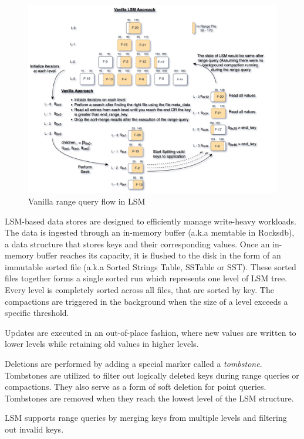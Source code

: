 \begin{figure}
    \includegraphics[scale=0.10]{Figures/Vanilla Range Query vanilla.png}
    \caption{Vanilla range query flow in LSM}\label{fig:vanilla_range_query}
\end{figure}

LSM-based data stores are designed to efficiently manage write-heavy workloads. The data is ingested through 
an in-memory buffer (a.k.a memtable in Rocksdb), a data structure that stores keys and their corresponding values. 
Once an in-memory buffer reaches its capacity, it is flushed to the disk in the form of an immutable sorted file (a.k.a Sorted Strings Table, SSTable or SST). 
These sorted files together forms a single sorted run which represents one level of LSM tree. Every level is completely sorted 
across all files, that are sorted by key. The compactions are triggered in the background when the size of a level exceeds a 
specific threshold.

 Updates are executed in an out-of-place fashion, where new values are written to lower levels 
while retaining old values in higher levels.

 Deletions are performed by adding a special marker called a \textit{tombstone}. Tombstones are 
utilized to filter out logically deleted keys during range queries or compactions. They also serve as a form of soft 
deletion for point queries. Tombstones are removed when they reach the lowest level of the LSM structure.

 LSM supports range queries by merging keys from multiple levels and filtering out 
invalid keys.

